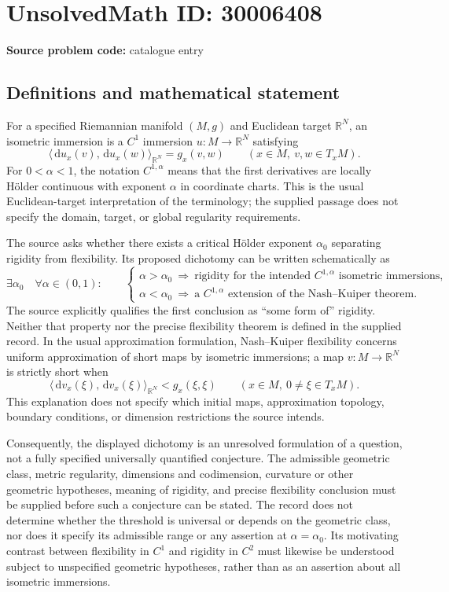 \documentclass[11pt]{article}
\newcommand{\R}{\mathbb{R}}
\newcommand{\dd}{\,\mathrm{d}}
\begin{document}
\section*{UnsolvedMath ID: 30006408}
\textbf{Source problem code:} catalogue entry
\subsection{Definitions and mathematical statement}
For a specified Riemannian manifold \((M,g)\) and Euclidean target \(\R^N\), an isometric immersion is a \(C^1\) immersion \(u:M\to\R^N\) satisfying
\[
\langle \dd u_x(v),\dd u_x(w)\rangle_{\R^N}=g_x(v,w)
\qquad(x\in M,\ v,w\in T_xM).
\]
For \(0<\alpha<1\), the notation \(C^{1,\alpha}\) means that the first derivatives are locally H\"older continuous with exponent \(\alpha\) in coordinate charts. This is the usual Euclidean-target interpretation of the terminology; the supplied passage does not specify the domain, target, or global regularity requirements.

The source asks whether there exists a critical H\"older exponent \(\alpha_0\) separating rigidity from flexibility. Its proposed dichotomy can be written schematically as
\[
\exists\alpha_0\quad\forall\alpha\in(0,1):\qquad
\begin{cases}
\alpha>\alpha_0\ \Longrightarrow\ \text{rigidity for the intended }C^{1,\alpha}\text{ isometric immersions},\\
\alpha<\alpha_0\ \Longrightarrow\ \text{a }C^{1,\alpha}\text{ extension of the Nash--Kuiper theorem}.
\end{cases}
\]
The source explicitly qualifies the first conclusion as ``some form of'' rigidity. Neither that property nor the precise flexibility theorem is defined in the supplied record. In the usual approximation formulation, Nash--Kuiper flexibility concerns uniform approximation of short maps by isometric immersions; a map \(v:M\to\R^N\) is strictly short when
\[
\langle \dd v_x(\xi),\dd v_x(\xi)\rangle_{\R^N}<g_x(\xi,\xi)
\qquad(x\in M,\ 0\ne\xi\in T_xM).
\]
This explanation does not specify which initial maps, approximation topology, boundary conditions, or dimension restrictions the source intends.

Consequently, the displayed dichotomy is an unresolved formulation of a question, not a fully specified universally quantified conjecture. The admissible geometric class, metric regularity, dimensions and codimension, curvature or other geometric hypotheses, meaning of rigidity, and precise flexibility conclusion must be supplied before such a conjecture can be stated. The record does not determine whether the threshold is universal or depends on the geometric class, nor does it specify its admissible range or any assertion at \(\alpha=\alpha_0\). Its motivating contrast between flexibility in \(C^1\) and rigidity in \(C^2\) must likewise be understood subject to unspecified geometric hypotheses, rather than as an assertion about all isometric immersions.
\end{document}
